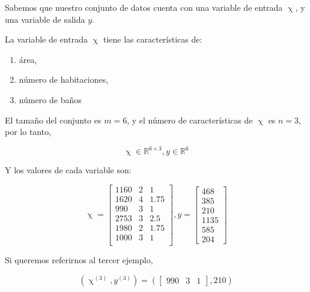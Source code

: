 \documentclass[twoside,twocolumn]{article}
\newcommand{\realset}{\mathbb{R}} %
\begin{document}
          Sabemos que nuestro conjunto de datos cuenta con una variable de entrada $\upchi$,
          y una variable de salida $y$.

          La variable de entrada $\upchi$ tiene las características de: 
          \begin{enumerate}
            \item área,
            \item número de habitaciones,
            \item número de baños
          \end{enumerate}

          El tamaño del conjunto es $m = 6$, y el número de características
          de $\upchi$ es $n = 3$, por lo tanto,

          \[
            \upchi \in \realset^{6 \times 3}
            ,
            y \in \realset^{6}
          \]

          Y los valores de cada variable son:

          \[
            \upchi
            =
            \begin{bmatrix}
              1160 & 2 & 1 \\
              1620 & 4 & 1.75 \\
              990 & 3 & 1 \\
              2753 & 3 & 2.5 \\
              1980 & 2 & 1.75 \\
              1000 & 3 & 1 \\ 
            \end{bmatrix}
            ,
            y
            =
            \begin{bmatrix}
              468  \\
              385  \\
              210  \\
              1135  \\
              585  \\
              204
            \end{bmatrix}
          \]

          Si queremos referirnos al tercer ejemplo, 

          \[
            (\upchi^{(3)}, y^{(3)})
            =
            (\begin{bmatrix}
              990 & 3 & 1
            \end{bmatrix},
            210)
          \]
\end{document}

